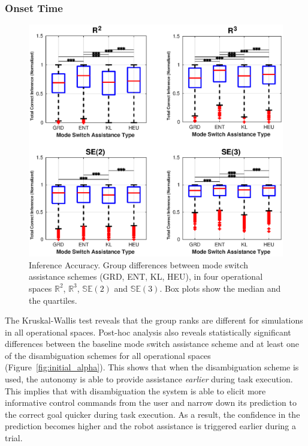 \documentclass[letterpaper, 10 pt, conference]{ieeeconf}  %
\begin{document}
\subsubsection{Onset Time}
\begin{figure}[t!]
	\centering
	\includegraphics[width= 1.1\hsize, height=0.45\vsize, center]{./figures/correct_inference.eps}
	\vspace{-0.75cm}
	\caption{Inference Accuracy. Group differences between mode switch assistance schemes (GRD, ENT, KL, HEU), in four operational spaces $\mathbb{R}^2$, $\mathbb{R}^3$, $\mathbb{SE}(2)$ and $\mathbb{SE}(3)$. Box plots show the median and the quartiles.} 
	\label{fig:correct_inference}
\end{figure}

The Kruskal-Wallis test reveals that the group ranks are different for simulations in all operational spaces. Post-hoc analysis also reveals statistically significant differences between the baseline mode switch assistance scheme and at least one of the disambiguation schemes for all operational spaces (Figure~\ref{fig:initial_alpha}). This shows that when the disambiguation scheme is used, the autonomy is able to provide assistance \textit{earlier} during task execution. This implies that with disambiguation the system is able to elicit more informative control commands from the user and narrow down its prediction to the correct goal quicker during task execution. As a result, the confidence in the prediction becomes higher and the robot assistance is triggered earlier during a trial. 
\end{document}
